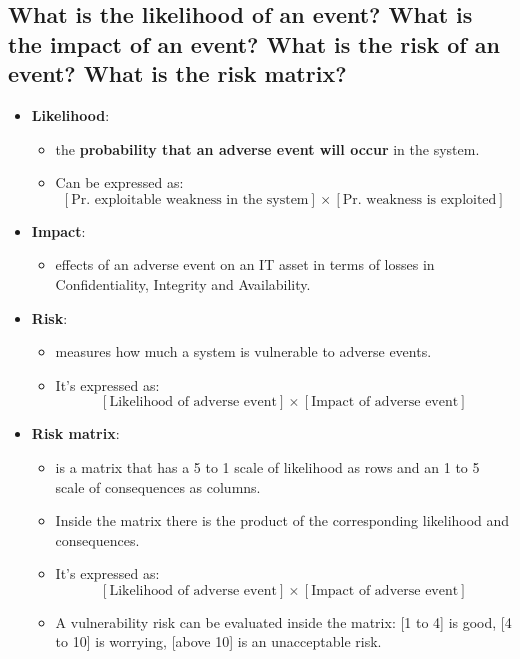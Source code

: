 \documentclass[9pt, letterpaper]{article}
\begin{document}
\subsection{What is the likelihood of an event? What is the impact of an event? What is the risk of an event? What is the risk matrix?}
\begin{itemize}
	\item \textbf{Likelihood}:
	      \begin{itemize}
		      \item the \textbf{probability that an adverse event will occur} in the system.
		      \item  Can be expressed as: $$[\text{Pr. exploitable weakness in the system}] \times [\text{Pr. weakness is exploited}]$$
	      \end{itemize}
	\item \textbf{Impact}:
	      \begin{itemize}
		      \item effects of an adverse event on an IT asset in terms of losses in Confidentiality, Integrity and Availability.
	      \end{itemize}
	\item \textbf{Risk}:
	      \begin{itemize}
		      \item measures how much a system is vulnerable to adverse events.
		      \item It's expressed as: $$[\text{Likelihood of adverse event}] \times [\text{Impact of adverse event}]$$
	      \end{itemize}
	\item \textbf{Risk matrix}:
	      \begin{itemize}
		      \item is a matrix that has a 5 to 1 scale of likelihood as rows and an 1 to 5 scale of consequences as columns.
		      \item Inside the matrix there is the product of the corresponding likelihood and consequences.
		      \item It's expressed as: $$[\text{Likelihood of adverse event}] \times [\text{Impact of adverse event}]$$
		      \item A vulnerability risk can be evaluated inside the matrix: [1 to 4] is good, [4 to 10] is worrying, [above 10] is an unacceptable risk.
	      \end{itemize}
\end{itemize}

\newpage
\end{document}
